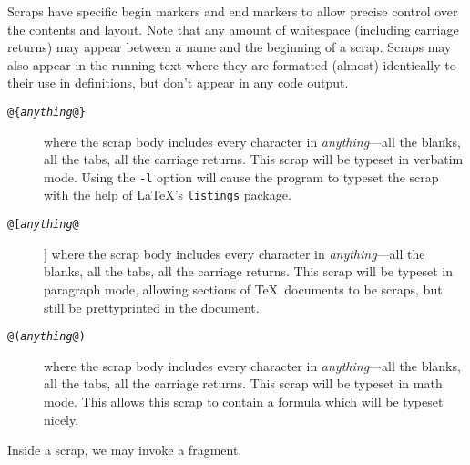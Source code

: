 \documentclass[a4paper]{report}
\begin{document}
Scraps have specific begin markers and end markers to allow precise
control over the contents and layout. Note that any amount of
whitespace (including carriage returns) may appear between a name and
the beginning of a scrap. Scraps may also appear in the running text
where they are formatted (almost) identically to their use in definitions,
but don't appear in any code output.
\begin{description}
\item[\tt @\{{\em anything\/}@\}] where the scrap body includes every
  character in {\em anything\/}---all the blanks, all the tabs, all the
  carriage returns.  This scrap will be typeset in verbatim mode. Using
  the \texttt{-l} option will cause the program to typeset the scrap with
  the help of \LaTeX's \texttt{listings} package.
\item[\tt @[{\em anything\/}@]] where the scrap body includes every
  character in {\em anything\/}---all the blanks, all the tabs, all the
  carriage returns.  This scrap will be typeset in paragraph mode, allowing
  sections of \TeX\ documents to be scraps, but still  be prettyprinted
  in the document.
\item[\tt @({\em anything\/}@)] where the scrap body includes every
  character in {\em anything\/}---all the blanks, all the tabs, all the
  carriage returns.  This scrap will be typeset in math mode.  This allows
  this scrap to contain a formula which will be typeset nicely.
\end{description}
Inside a scrap, we may invoke a fragment.
\end{document}
